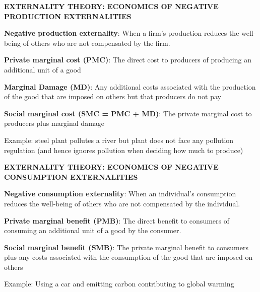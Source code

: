 \documentclass[landscape]{slides}
\begin{document}

\begin{slide}
\begin{center}
{\bf EXTERNALITY THEORY: ECONOMICS OF NEGATIVE PRODUCTION EXTERNALITIES}
\end{center}

{\bf Negative production externality}:
When a firm's production reduces the well-being of others who are not compensated by the firm.

{\bf Private marginal cost (PMC)}:
The direct cost to producers of producing an additional unit of a good

{\bf Marginal Damage (MD)}:
Any additional costs associated with the production of the good that are imposed on others
but that producers do not pay

{\bf Social marginal cost (SMC = PMC + MD)}:
The private marginal cost to producers plus marginal damage

Example: steel plant pollutes a river but plant does not face any pollution regulation (and hence
ignores pollution when deciding how much to produce)

\end{slide}

\begin{slide}

\end{slide}



\begin{slide}
\begin{center}
{\bf EXTERNALITY THEORY: ECONOMICS OF NEGATIVE CONSUMPTION EXTERNALITIES}
\end{center}
{\bf Negative consumption externality}:
When an individual's consumption reduces the well-being of others who are not compensated by the individual.


{\bf Private marginal benefit (PMB)}:
The direct benefit to consumers of consuming an additional unit of a good by the consumer.

{\bf Social marginal benefit (SMB)}:
The private marginal benefit to  consumers plus any costs associated with the consumption
of the good that are imposed on others

Example: Using a car and emitting carbon contributing to global warming
\end{slide}


\begin{slide}

\end{slide}
\end{document}
